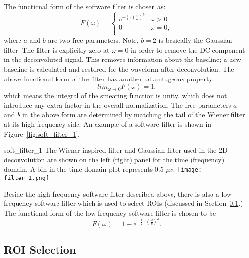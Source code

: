 The functional form of the software filter is chosen as:
\begin{equation}
F(\omega) = 
\begin{cases}
e^{- \frac{1}{2} \cdot \left( \frac{\omega}{a} \right)^b} &  \omega >0 \\
0 &  \omega = 0, \\
\end{cases}
\end{equation}
where $a$ and $b$ are two free parameters.  Note, $b=2$ is basically the Gaussian filter. 
The filter is explicitly zero at $\omega = 0$ in order to remove the DC component in the 
deconvoluted signal. This removes information about the baseline;  a new baseline is 
calculated and restored for the waveform after deconvolution. The above functional form 
of the filter has another advantageous property:
\begin{equation}
lim_{\omega \rightarrow 0} F(\omega) = 1.
\end{equation}
which means the integral of the smearing function is unity, which does not introduce any
extra factor in the overall normalization. The free parameters $a$ and $b$ in the above 
form are determined by matching the tail of the Wiener filter at its high-frequency side. 
An example of a software filter is shown in Figure~\ref{fig:soft_filter_1}. 

\begin{cdrfigure}{soft_filter_1}{
The Wiener-inspired filter and Gaussian filter used in the 2D deconvolution are shown on 
the left (right) panel for the time (frequency) domain. A bin in the time domain plot represents 0.5 $\mu s$.}
\texttt{[image: filter\_1.png]}
\end{cdrfigure}

Beside the high-frequency software filter described above, there is also a low-frequency 
software filter which is used to select ROIs (discussed in Section~\ref{sec:decon-roi-selection}.) %
The functional form of the low-frequency software filter is chosen to be 
\begin{equation}
F(\omega) = 1- e^{-\frac{1}{2}\cdot \left( \frac{\omega}{c} \right)^2}.
\end{equation}

\subsection{ROI Selection}
\label{sec:decon-roi-selection}

